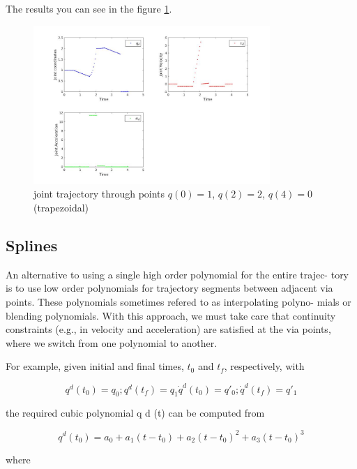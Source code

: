\documentclass[12pt, a4paper]{report}
\begin{document}
The results you can see in the figure \ref{fig:mesh6}.

\begin{figure}[H]
	\centering
		\includegraphics[width=0.8\textwidth]{22} %
	\caption{joint trajectory through points $q(0) = 1$, $q(2) = 2$, $q(4) = 0$ (trapezoidal)} %
	\label{fig:mesh6}
\end{figure}


{\centering
\subsection*{Splines}
}
%

An alternative to using a single high order polynomial for the entire trajec-
tory is to use low order polynomials for trajectory segments between adjacent
via points. These polynomials sometimes refered to as interpolating polyno-
mials or blending polynomials. With this approach, we must take care that
continuity constraints (e.g., in velocity and acceleration) are satisfied at the via
points, where we switch from one polynomial to another.

For example, given initial and final times, $t_0$ and $t_f$, respectively, with 

\begin{equation}
	q^d(t_0) = q_0	;	q^d(t_f) = q_1
	\dot{q}^d(t_0) = q'_0	;	\dot{q}^d(t_f) = q'_1
\end{equation}

the required cubic polynomial q d (t) can be computed from

\begin{equation}
	q^d(t_0) = a_0 + a_1(t-t_0) + a_2(t-t_0)^2 +a_3(t-t_0)^3
\end{equation}

where 
\end{document}
